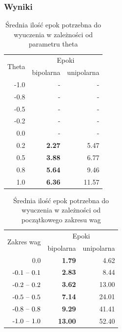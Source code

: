 \documentclass{article}
\begin{document}
\subsubsection*{Wyniki}

\begin{table}[!h]
	\caption{Średnia ilość epok potrzebna do wyuczenia w zależności od parametru theta}
	\label{tabela-res-41}
	\centering
	\begin{tabular}{rrr}
		\toprule
		\multirow{2}{*}{Theta}   & \multicolumn{2}{c}{Epoki} \\
		     & bipolarna     & unipolarna \\
		\midrule
		-1.0 & -             & -          \\
		-0.8 & -             & -          \\
		-0.5 & -             & -          \\
		-0.2 & -             & -          \\
		0.0  & -             & -          \\
		0.2  & \textbf{2.27} & 5.47       \\
		0.5  & \textbf{3.88} & 6.77       \\
		0.8  & \textbf{5.64} & 9.46       \\
		1.0  & \textbf{6.36} & 11.57      \\
		\bottomrule
	\end{tabular}
\end{table}

\begin{table}[!h]
	\caption{Średnia ilość epok potrzebna do wyuczenia w zależności od początkowego zakresu wag}
	\label{tabela-res-42}
	\centering
	\begin{tabular}{rrr}
		\toprule
		\multirow{2}{*}{Zakres wag}   & \multicolumn{2}{c}{Epoki} \\
		                  & bipolarna      & unipolarna \\
		\midrule
		0.0               & \textbf{1.79}  & 4.62       \\
		\($-0.1 -- 0.1$\) & \textbf{2.83}  & 8.44       \\
		\($-0.2 -- 0.2$\) & \textbf{3.62}  & 13.00      \\
		\($-0.5 -- 0.5$\) & \textbf{7.14}  & 24.01      \\
		\($-0.8 -- 0.8$\) & \textbf{9.29}  & 41.41      \\
		\($-1.0 -- 1.0$\) & \textbf{13.00} & 52.40      \\
		\bottomrule
	\end{tabular}
\end{table}
\end{document}
